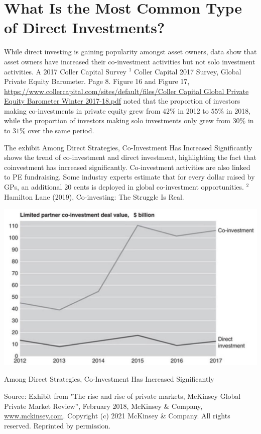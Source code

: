 \documentclass[11pt]{article}
\begin{document}
\section*{What Is the Most Common Type of Direct Investments?}
While direct investing is gaining popularity amongst asset owners, data show that asset owners have increased their co-investment activities but not solo investment activities. A 2017 Coller Capital Survey ${ }^{1}$ Coller Capital 2017 Survey, Global Private Equity Barometer. Page 8. Figure 16 and Figure 17, \href{https://www.collercapital.com/sites/default/files/Coller%20Capital%20Global%20Private%20Equity%20Barometer%20Winter%202017-18.pdf}{https://www.collercapital.com/sites/default/files/Coller Capital Global Private Equity Barometer Winter 2017-18.pdf} noted that the proportion of investors making co-investments in private equity grew from $42 \%$ in 2012 to $55 \%$ in 2018, while the proportion of investors making solo investments only grew from $30 \%$ in to $31 \%$ over the same period.

The exhibit Among Direct Strategies, Co-Investment Has Increased Significantly shows the trend of co-investment and direct investment, highlighting the fact that coinvestment has increased significantly. Co-investment activities are also linked to PE fundraising. Some industry experts estimate that for every dollar raised by GPs, an additional 20 cents is deployed in global co-investment opportunities. ${ }^{2}$ Hamilton Lane (2019), Co-investing: The Struggle Is Real.

\begin{center}
\includegraphics[max width=\textwidth]{2024_04_10_b9f91501c03ad990a1d8g-3}
\end{center}

Among Direct Strategies, Co-Investment Has Increased Significantly

Source: Exhibit from "The rise and rise of private markets, McKinsey Global Private Market Review”, February 2018, McKinsey \& Company, \href{http://www.mckinsey.com}{www.mckinsey.com}. Copyright (c) 2021 McKinsey \& Company. All rights reserved. Reprinted by permission.
\end{document}

